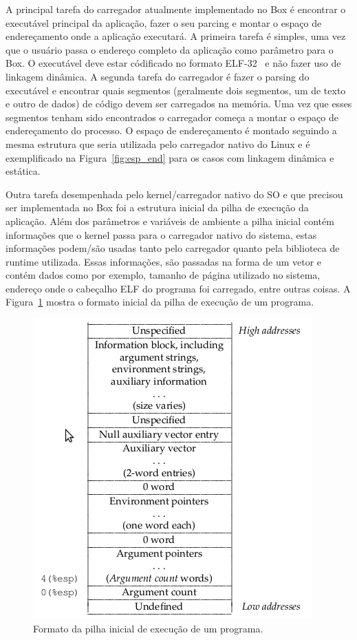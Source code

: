 \documentclass[11pt,twoside]{article}
\begin{document}
A principal tarefa do carregador atualmente implementado no Box é 
encontrar o executável principal da aplicação, fazer o seu parcing e
montar o espaço de endereçamento onde a aplicação executará. A primeira
tarefa é simples, uma vez que o usuário passa o endereço completo da
aplicação como parâmetro para o Box. O executável deve estar códificado
no formato ELF-32~\cite{SCO1997} e não fazer uso de linkagem dinâmica. A 
segunda tarefa do carregador é fazer o parsing do executável e encontrar
quais segmentos (geralmente dois segmentos, um de texto e outro de dados) 
de código devem ser carregados na memória. Uma vez que esses segmentos 
tenham sido encontrados o carregador começa a montar o espaço de 
endereçamento do processo. O espaço de endereçamento é montado seguindo
a mesma estrutura que seria utilizada pelo carregador nativo do Linux e
é exemplificado na Figura~\ref{fig:esp_end} para os casos com linkagem
dinâmica e estática.

Outra tarefa desempenhada pelo kernel/carregador nativo do SO e que
precisou ser implementada no Box foi a estrutura inicial da pilha de
execução da aplicação. Além dos parâmetros e variáveis de ambiente a
pilha inicial contém informações que o kernel passa para o carregador
nativo do sistema, estas informações podem/são usadas tanto pelo
carregador quanto pela biblioteca de runtime utilizada. Essas informações,
são passadas na forma de um vetor e contém dados como por exemplo, 
tamanho de página utilizado no sistema, endereço onde o cabeçalho ELF do 
programa foi carregado, entre outras coisas. A Figura~\ref{fig:stack_ini}
mostra o formato inicial da pilha de execução de um programa.

\begin{figure}[!h]
  	\begin{center}
    	\includegraphics[scale=0.5]{figures/stack_ini.png}
	\end{center}
	\caption{Formato da pilha inicial de execução de um programa.}
	\label{fig:stack_ini}
\end{figure}
\end{document}
